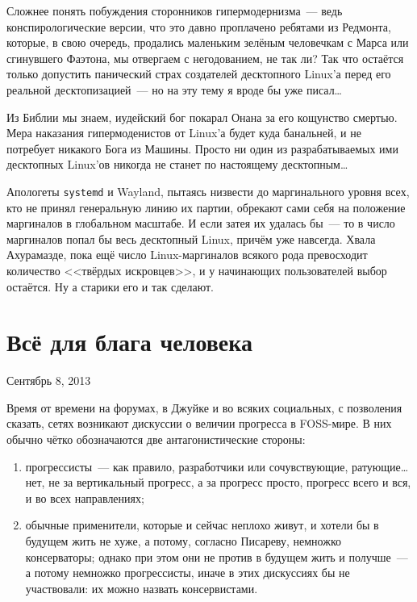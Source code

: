 Сложнее понять побуждения сторонников гипермодернизма~--- ведь конспирологические версии, что это давно проплачено ребятами из Редмонта, которые, в свою очередь, продались маленьким зелёным человечкам с Марса или сгинувшего Фаэтона, мы отвергаем с негодованием, не так ли? Так что остаётся только допустить панический страх создателей десктопного Linux'а перед его реальной десктопизацией~--- но на эту тему я вроде бы уже писал\dots

Из Библии мы знаем, иудейский бог покарал Онана за его кощунство смертью. Мера наказания гипермоденистов от Linux'а будет куда банальней, и не потребует никакого Бога из Машины. Просто ни один из разрабатываемых ими десктопных Linux'ов никогда не станет по настоящему десктопным\dots

Апологеты \texttt{systemd} и Wayland, пытаясь низвести до маргинального уровня всех, кто не принял генеральную линию их партии, обрекают сами себя на положение маргиналов в глобальном масштабе. И если затея их удалась бы~--- то в число маргиналов попал бы весь десктопный Linux, причём уже навсегда. Хвала Ахурамазде, пока ещё число Linux-маргиналов всякого рода превосходит количество <<твёрдых искровцев>>, и у начинающих пользователей выбор остаётся. Ну а старики его и так сделают.

\section{Всё для блага человека} 
\begin{timeline}Сентябрь 8, 2013\end{timeline}

Время от времени на форумах, в Джуйке и во всяких социальных, с позволения сказать, сетях возникают дискуссии о величии прогресса в FOSS-мире. В них обычно чётко обозначаются две антагонистические стороны:


\begin{enumerate}
	\item прогрессисты~--- как правило, разработчики или сочувствующие, ратующие\dots нет, не за вертикальный прогресс, а за прогресс просто, прогресс всего и вся, и во всех направлениях; 
	\item обычные применители, которые и сейчас неплохо живут, и хотели бы в будущем жить не хуже, а потому, согласно Писареву, немножко консерваторы; однако при этом они не против в  будущем жить и получше~--- а потому немножко прогрессисты, иначе в этих дискуссиях бы не участвовали: их можно назвать консервистами. 
\end{enumerate}



